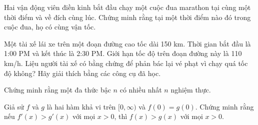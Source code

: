 \begin{exercise}
Hai vận động viên điền kinh bắt đầu chạy một cuộc đua marathon tại cùng một thời điểm và về đích cùng lúc. Chứng minh rằng tại một thời điểm nào đó trong cuộc đua, họ có cùng vận tốc.
\end{exercise}

\begin{exercise}
Một tài xế lái xe trên một đoạn đường cao tốc dài 150 km. Thời gian bắt đầu là 1:00 PM và kết thúc là 2:30 PM. Giới hạn tốc độ trên đoạn đường này là 110 km/h. Liệu người tài xế có bằng chứng để phản bác lại vé phạt vì chạy quá tốc độ không? Hãy giải thích bằng các công cụ đã học. %
\end{exercise}

\begin{exercise}
Chứng minh rằng một đa thức bậc $n$ có nhiều nhất $n$ nghiệm thực.
\end{exercise}

\begin{exercise}
Giả sử $f$ và $g$ là hai hàm khả vi trên $[0, \infty)$ và $f(0)=g(0)$. Chứng minh rằng nếu $f'(x) > g'(x)$ với mọi $x>0$, thì $f(x) > g(x)$ với mọi $x>0$.
\end{exercise}
